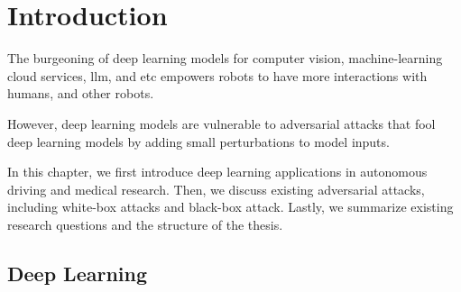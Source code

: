 \chapter{Introduction}
\label{chpt:intro}

The burgeoning of deep learning models for computer vision, machine-learning cloud services, \acrfull{llm},  and etc empowers robots to have more interactions with humans, and other robots. 


However, deep learning models are vulnerable to adversarial attacks that fool deep learning models by adding small perturbations to model inputs.

In this chapter, we first introduce deep learning applications in autonomous driving and medical research. Then, we discuss existing adversarial attacks, including white-box attacks and black-box attack. Lastly, we summarize existing research questions and the structure of the thesis.



\section{Deep Learning}
\label{sec:deep_learning}


